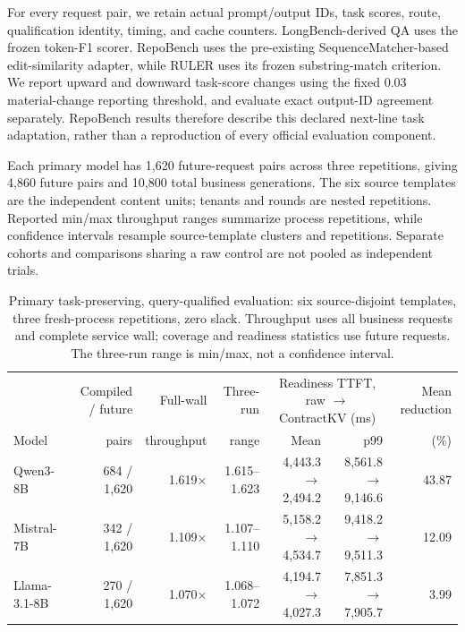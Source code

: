 For every request pair, we retain actual prompt/output IDs, task scores, route, qualification identity, timing, and cache counters. LongBench-derived QA uses the frozen token-F1 scorer. RepoBench uses the pre-existing SequenceMatcher-based edit-similarity adapter, while RULER uses its frozen substring-match criterion. We report upward and downward task-score changes using the fixed 0.03 material-change reporting threshold, and evaluate exact output-ID agreement separately. RepoBench results therefore describe this declared next-line task adaptation, rather than a reproduction of every official evaluation component.

Each primary model has 1,620 future-request pairs across three repetitions, giving 4,860 future pairs and 10,800 total business generations. The six source templates are the independent content units; tenants and rounds are nested repetitions. Reported min/max throughput ranges summarize process repetitions, while confidence intervals resample source-template clusters and repetitions. Separate cohorts and comparisons sharing a raw control are not pooled as independent trials.

\begin{table}[t]
\centering\small
\caption{Primary task-preserving, query-qualified evaluation: six source-disjoint templates, three fresh-process repetitions, zero slack. Throughput uses all business requests and complete service wall; coverage and readiness statistics use future requests. The three-run range is min/max, not a confidence interval.}
\label{tab:primary}
\begin{tabular}{@{}lrrrrrr@{}}
\toprule
& Compiled / future & Full-wall & Three-run & \multicolumn{2}{c}{Readiness TTFT, raw $\rightarrow$ ContractKV (ms)} & Mean reduction\\
Model & pairs & throughput & range & Mean & p99 & (\%)\\
\midrule
Qwen3-8B & 684 / 1,620 & 1.619$\times$ & 1.615--1.623 & 4,443.3 $\rightarrow$ 2,494.2 & 8,561.8 $\rightarrow$ 9,146.6 & 43.87\\
Mistral-7B & 342 / 1,620 & 1.109$\times$ & 1.107--1.110 & 5,158.2 $\rightarrow$ 4,534.7 & 9,418.2 $\rightarrow$ 9,511.3 & 12.09\\
Llama-3.1-8B & 270 / 1,620 & 1.070$\times$ & 1.068--1.072 & 4,194.7 $\rightarrow$ 4,027.3 & 7,851.3 $\rightarrow$ 7,905.7 & 3.99\\
\bottomrule
\end{tabular}
\end{table}

